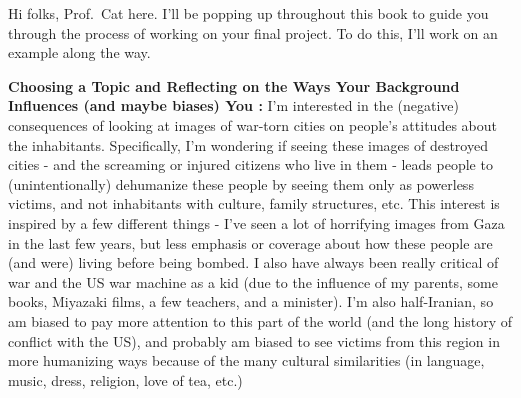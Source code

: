 \documentclass[
  letterpaper,
  DIV=11,
  numbers=noendperiod,
  oneside]{scrreprt}
\begin{document}
\begin{tcolorbox}[enhanced jigsaw, toptitle=1mm, toprule=.15mm, rightrule=.15mm, breakable, left=2mm, colbacktitle=quarto-callout-tip-color!10!white, colback=white, opacityback=0, coltitle=black, bottomtitle=1mm, opacitybacktitle=0.6, titlerule=0mm, leftrule=.75mm, arc=.35mm, bottomrule=.15mm, title=\textcolor{quarto-callout-tip-color}{\faLightbulb}\hspace{0.5em}{Prof.~Cat Has An Idea}, colframe=quarto-callout-tip-color-frame]

Hi folks, Prof.~Cat here. I'll be popping up throughout this book to
guide you through the process of working on your final project. To do
this, I'll work on an example along the way.

\textbf{Choosing a Topic and Reflecting on the Ways Your Background
Influences (and maybe biases) You :} I'm interested in the (negative)
consequences of looking at images of war-torn cities on people's
attitudes about the inhabitants. Specifically, I'm wondering if seeing
these images of destroyed cities - and the screaming or injured citizens
who live in them - leads people to (unintentionally) dehumanize these
people by seeing them only as powerless victims, and not inhabitants
with culture, family structures, etc. This interest is inspired by a few
different things - I've seen a lot of horrifying images from Gaza in the
last few years, but less emphasis or coverage about how these people are
(and were) living before being bombed. I also have always been really
critical of war and the US war machine as a kid (due to the influence of
my parents, some books, Miyazaki films, a few teachers, and a minister).
I'm also half-Iranian, so am biased to pay more attention to this part
of the world (and the long history of conflict with the US), and
probably am biased to see victims from this region in more humanizing
ways because of the many cultural similarities (in language, music,
dress, religion, love of tea, etc.)

\end{tcolorbox}

\end{document}
